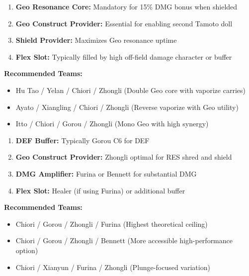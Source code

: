 \documentclass[12pt,a4paper]{article}
\begin{document}
\begin{tcolorbox}[colback=c0color!5, colframe=c0color, title=C0 Sub-DPS Optimal Team Structure]
\begin{enumerate}
    \item \textbf{Geo Resonance Core:} Mandatory for 15\% DMG bonus when shielded
    \item \textbf{Geo Construct Provider:} Essential for enabling second Tamoto doll
    \item \textbf{Shield Provider:} Maximizes Geo resonance uptime
    \item \textbf{Flex Slot:} Typically filled by high off-field damage character or buffer
\end{enumerate}

\textbf{Recommended Teams:}
\begin{itemize}
    \item Hu Tao / Yelan / Chiori / Zhongli (Double Geo core with vaporize carries)
    \item Ayato / Xiangling / Chiori / Zhongli (Reverse vaporize with Geo utility)
    \item Itto / Chiori / Gorou / Zhongli (Mono Geo with high synergy)
\end{itemize}
\end{tcolorbox}

\begin{tcolorbox}[colback=c6color!5, colframe=c6color, title=C6 Main DPS Optimal Team Structure]
\begin{enumerate}
    \item \textbf{DEF Buffer:} Typically Gorou C6 for DEF%
    \item \textbf{Geo Construct Provider:} Zhongli optimal for RES shred and shield
    \item \textbf{DMG Amplifier:} Furina or Bennett for substantial DMG%
    \item \textbf{Flex Slot:} Healer (if using Furina) or additional buffer
\end{enumerate}

\textbf{Recommended Teams:}
\begin{itemize}
    \item Chiori / Gorou / Zhongli / Furina (Highest theoretical ceiling)
    \item Chiori / Gorou / Zhongli / Bennett (More accessible high-performance option)
    \item Chiori / Xianyun / Furina / Zhongli (Plunge-focused variation)
\end{itemize}
\end{tcolorbox}
\end{document}
